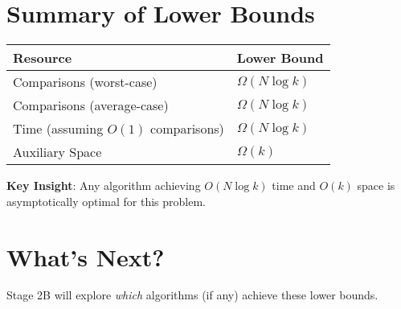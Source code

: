 \documentclass[11pt]{article}
\begin{document}
\section{Summary of Lower Bounds}

\begin{table}[h]
\centering
\begin{tabular}{ll}
\hline
\textbf{Resource} & \textbf{Lower Bound} \\
\hline
Comparisons (worst-case) & $\Omega(N \log k)$ \\
Comparisons (average-case) & $\Omega(N \log k)$ \\
Time (assuming $O(1)$ comparisons) & $\Omega(N \log k)$ \\
Auxiliary Space & $\Omega(k)$ \\
\hline
\end{tabular}
\end{table}

\textbf{Key Insight}: Any algorithm achieving $O(N \log k)$ time and $O(k)$ space is asymptotically optimal for this problem.

\section{What's Next?}

Stage 2B will explore \textit{which} algorithms (if any) achieve these lower bounds.
\end{document}
